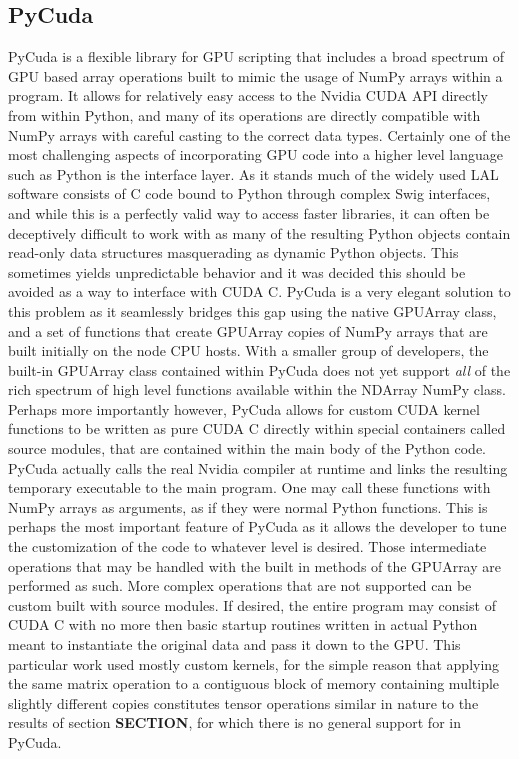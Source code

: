 \subsection{PyCuda} 
PyCuda is a flexible library for GPU scripting that includes a broad spectrum of GPU based array operations built to mimic the usage of NumPy arrays within a program. It allows for relatively easy access to the Nvidia CUDA API directly from within Python, and many of its operations are directly compatible with NumPy arrays with careful casting to the correct data types. Certainly one of the most challenging aspects of incorporating GPU code into a higher level language such as Python is the interface layer. As it stands much of the widely used LAL software consists of C code bound to Python through complex Swig interfaces, and while this is a perfectly valid way to access faster libraries, it can often be deceptively difficult to work with as many of the resulting Python objects contain read-only data structures masquerading as dynamic Python objects. This sometimes yields unpredictable behavior and it was decided this should be avoided as a way to interface with CUDA C. PyCuda is a very elegant solution to this problem as it seamlessly bridges this gap using the native GPUArray class, and a set of functions that create GPUArray copies of NumPy arrays that are built initially on the node CPU hosts. 
With a smaller group of developers, the built-in GPUArray class contained within PyCuda does not yet support \textit{all} of the rich spectrum of high level functions available within the NDArray NumPy class. Perhaps more importantly however, PyCuda allows for custom CUDA kernel functions to be written as pure CUDA C directly within special containers called source modules, that are contained within the main body of the Python code. PyCuda actually calls the real Nvidia compiler at runtime and links the resulting temporary executable to the main program. One may call these functions with NumPy arrays as arguments, as if they were normal Python functions. This is perhaps the most important feature of PyCuda as it allows the developer to tune the customization of the code to whatever level is desired. Those intermediate operations that may be handled with the built in methods of the GPUArray are performed as such. More complex operations that are not supported can be custom built with source modules. If desired, the entire program may consist of CUDA C with no more then basic startup routines written in actual Python meant to instantiate the original data and pass it down to the GPU. This particular work used mostly custom kernels, for the simple reason that applying the same matrix operation to a contiguous block of memory containing multiple slightly different copies constitutes tensor operations similar in nature to the results of section \textbf{SECTION}, for which there is no general support for in PyCuda.  

